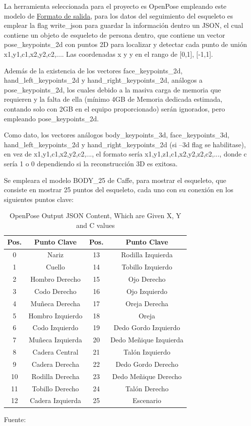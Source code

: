 La herramienta seleccionada para el proyecto es OpenPose empleando este modelo de \href{https://github.com/CMU-Perceptual-Computing-Lab/openpose/blob/master/doc/output.md}{Formato de salida}, para los datos del seguimiento del esqueleto es emplear la flag write\_json para guardar la información dentro un JSON, el cual contiene un objeto de esqueleto de persona dentro, que contiene un vector pose\_keypoints\_2d con puntos 2D para localizar y detectar cada punto de unión x1,y1,c1,x2,y2,c2,.... Las coordenadas x y y en el rango de [0,1], [-1,1].

Además de la existencia de los vectores face\_keypoints\_2d, hand\_left\_keypoints\_2d y hand\_right\_keypoints\_2d, análogos a pose\_keypoints\_2d, los cuales debido a la masiva carga de memoria que requieren y la falta de ella (mínimo 4GB de Memoria dedicada estimada, contando solo con 2GB en el equipo proporcionado) serán ignorados, pero empleando pose\_keypoints\_2d.

Como dato, los vectores análogos body\_keypoints\_3d, face\_keypoints\_3d,
hand\_left\_keypoints\_2d y hand\_right\_keypoints\_2d (si --3d flag se habilitase), en vez de 
x1,y1,c1,x2,y2,c2,..., el formato sería x1,y1,z1,c1,x2,y2,z2,c2,..., donde c sería 1 o 0 dependiendo si la reconstrucción 3D es exitosa.

Se empleara el modelo BODY\_25 de Caffe, para mostrar el esqueleto, que consiste en mostrar 25 puntos del esqueleto, cada uno con su conexión en los siguientes puntos clave:

\begin{table}[t]
	\begin{center}
		\begin{tabular}{| c | c | c | c | }
			\hline Pos. & Punto Clave & Pos. & Punto Clave \\ \hline
			0 & Nariz&13 & Rodilla Izquierda \\ \hline
			1 & Cuello &14 & Tobillo Izquierdo \\ \hline
			2 & Hombro Derecho& 15 & Ojo Derecho \\ \hline
			3 & Codo Derecho & 16 & Ojo Izquierdo \\ \hline
			4 & Muñeca Derecha & 17 & Oreja Derecha \\ \hline
			5 & Hombro Izquierdo & 18 & Oreja \\ \hline
			6 & Codo Izquierdo & 19 & Dedo Gordo Izquierdo \\ \hline
			7 & Muñeca Izquierda & 20 & Dedo Meñique Izquierda \\ \hline
			8 & Cadera Central & 21 & Talón Izquierdo \\ \hline
			9 & Cadera Derecha & 22 & Dedo Gordo Derecho \\ \hline
			10 & Rodilla Derecha & 23 & Dedo Meñique Derecho\\ \hline
			11 & Tobillo Derecho & 24 & Talón Derecho \\ \hline
			12 & Cadera Izquierda & 25 & Escenario \\ \hline
		\end{tabular}
		\caption{OpenPose Output JSON Content, Which are Given X, Y and C values}
		\footnotesize Fuente:\cite{8765346}
	\end{center}
\end{table}


